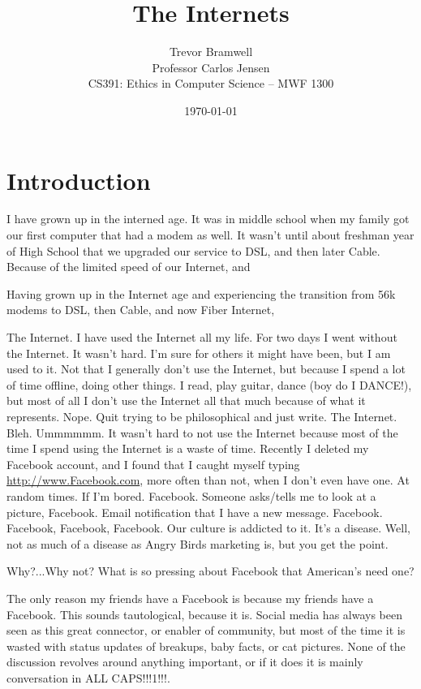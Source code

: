 \documentclass[12pt,letterpaper]{article}
\title{The Internets}
\author{
    Trevor Bramwell\\
    Professor Carlos Jensen\\
    CS391: Ethics in Computer Science -- MWF 1300\\
}
\date{\today}
\begin{document}
\maketitle

\section{Introduction}
I have grown up in the interned age. It was in  middle school when my
family got our first computer that had a modem as well. It wasn't until
about freshman year of High School that we upgraded our service to DSL,
and then later Cable. Because of the limited speed of our Internet, and 

Having grown up in the Internet age and experiencing the transition from
56k modems to DSL, then Cable, and now Fiber Internet,  

The Internet. I have used the Internet all my life. For two days I went
without the Internet. It wasn't hard. I'm sure for others it might have
been, but I am used to it. Not that I generally don't use the Internet,
but because I spend a lot of time offline, doing other things. I read,
play guitar, dance (boy do I DANCE!), but most of all I don't use the
Internet all that much because of what it represents. Nope. Quit trying
to be philosophical and just write. The Internet. Bleh. Ummmmmm. It
wasn't hard to not use the Internet because most of the time I spend
using the Internet is a waste of time. Recently I deleted my Facebook
account, and I found that I caught myself typing \url{http://www.Facebook.com}, more
often than not, when I don't even have one. At random times. If I'm
bored. Facebook. Someone asks/tells me to look at a picture, Facebook.
Email notification that I have a new message. Facebook. Facebook,
Facebook, Facebook. Our culture is addicted to it. It's a disease. Well,
not as much of a disease as Angry Birds marketing is, but you get the
point. 

 Why?...Why not? What is so pressing about
Facebook that American's need one? 

The only reason my friends have a Facebook is because my friends have a
Facebook. This sounds tautological, because it is. Social media has
always been seen as this great connector, or enabler of community, but
most of the time it is wasted  with status updates of breakups, baby
facts, or cat pictures. None of the discussion revolves around anything
important, or if it does it is mainly conversation in ALL
CAPS!!!1!!!.
\end{document}
